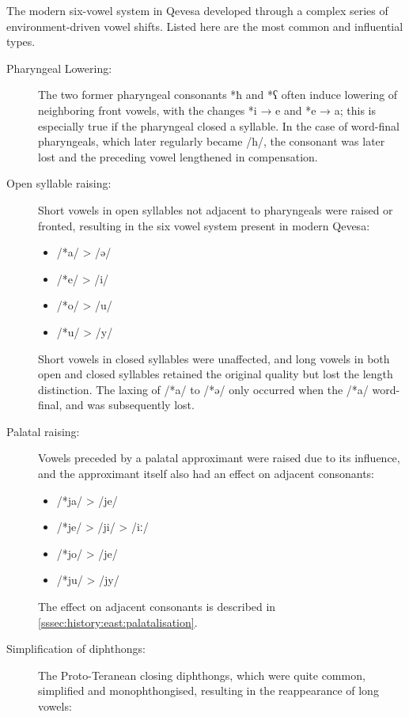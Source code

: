 \documentclass[grammar]{subfiles}
\begin{document}
The modern six-vowel system in Qevesa developed through a complex series of
environment-driven vowel shifts.  Listed here are the most common and
influential types.

\begin{description} 
  \item[Pharyngeal Lowering:] The two former pharyngeal consonants *ħ and *ʕ
    often induce lowering of neighboring front vowels, with the changes *i → e
    and *e → a; this is especially true if the pharyngeal closed a syllable.
    In the case of word-final pharyngeals, which later regularly became /h/,
    the consonant was later lost and the preceding vowel lengthened in
    compensation.

  \item[Open syllable raising:] Short vowels in open syllables not adjacent to
    pharyngeals were raised or fronted, resulting in the six vowel system
    present in modern Qevesa:

    \begin{itemize}
      \item /*a/ > /ə/ 
      \item /*e/ > /i/
      \item /*o/ > /u/
      \item /*u/ > /y/
    \end{itemize}

    Short vowels in closed syllables were unaffected, and long vowels in both
    open and closed syllables retained the original quality but lost the length
    distinction.  The laxing of /*a/ to /*ə/ only occurred when the /*a/
    word-final, and was subsequently lost.  

  \item[Palatal raising:] Vowels preceded by a palatal approximant were raised
    due to its influence, and the approximant itself also had an effect on
    adjacent consonants:

    \begin{itemize}
      \item /*ja/ > /je/
      \item /*je/ > /ji/ > /iː/
      \item /*jo/ > /je/
      \item /*ju/ > /jy/
    \end{itemize}

    The effect on adjacent consonants is described in
    \cref{sssec:history:east:palatalisation}.

  \item[Simplification of diphthongs:] The Proto-Teranean closing diphthongs,
    which were quite common, simplified and monophthongised, resulting in the
    reappearance of long vowels:  


\end{description}
\end{document}
